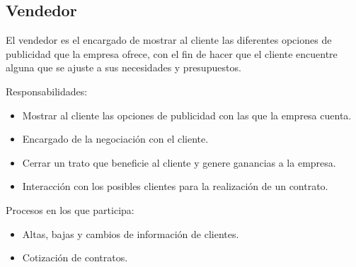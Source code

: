 \begin{Usuario}{\subsection{Vendedor}}{
	El vendedor es el encargado de mostrar al cliente las diferentes opciones de publicidad que la empresa ofrece, con el fin de hacer que el cliente encuentre alguna que se ajuste a sus necesidades y presupuestos.\\
}
    \item[Responsabilidades:] \cdtEmpty
    \begin{itemize}
		\item Mostrar al cliente las opciones de publicidad con las que la empresa cuenta.
        \item Encargado de la negociación con el cliente.
        \item Cerrar un trato que beneficie al cliente y genere ganancias a la empresa.
        \item Interacción con los posibles clientes para la realización de un contrato.
    \end{itemize}

	\item[Procesos en los que participa:] \cdtEmpty
    \begin{itemize}
		\item Altas, bajas y cambios de información de clientes.
		\item Cotización de contratos.
    \end{itemize}
\end{Usuario}

